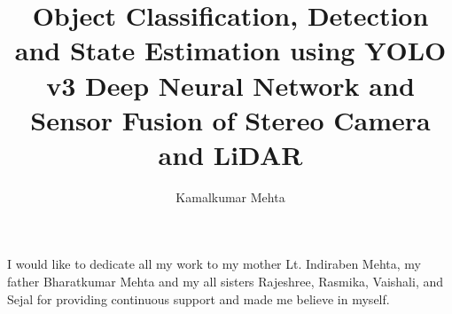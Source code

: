 \documentclass[12pt]{report}
\begin{document}
    

    

       \author{Kamalkumar Mehta}

       \title{Object Classification, Detection and State Estimation using YOLO v3 Deep Neural Network and Sensor Fusion of  Stereo Camera and LiDAR}


     \titlepage



         \copyrightpage

\newpage
\thispagestyle{empty}

	\vspace*{1.0in}
	\begin{center}
	
		I would like to dedicate all my work to my mother Lt. Indiraben Mehta, my father Bharatkumar Mehta and my all sisters Rajeshree, Rasmika, Vaishali, and Sejal for providing continuous support and made me believe in myself.  
		 
	\end{center}

\newpage

\end{document}
